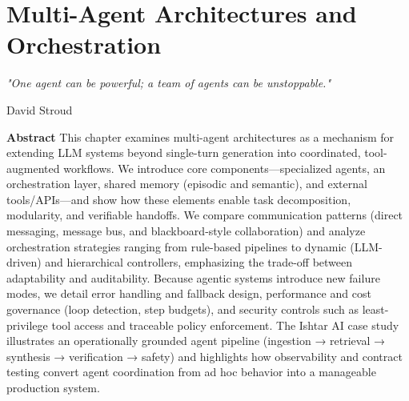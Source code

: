 \chapter{Multi-Agent Architectures and Orchestration}
\label{ch:multiagent}
\newrefsegment


\epigraph{\emph{"One agent can be powerful; a team of agents can be unstoppable."}}{David Stroud}

\textbf{Abstract} This chapter examines multi-agent architectures as a mechanism for extending LLM systems beyond single-turn generation into coordinated, tool-augmented workflows. We introduce core components—specialized agents, an orchestration layer, shared memory (episodic and semantic), and external tools/APIs—and show how these elements enable task decomposition, modularity, and verifiable handoffs. We compare communication patterns (direct messaging, message bus, and blackboard-style collaboration) and analyze orchestration strategies ranging from rule-based pipelines to dynamic (LLM-driven) and hierarchical controllers, emphasizing the trade-off between adaptability and auditability. Because agentic systems introduce new failure modes, we detail error handling and fallback design, performance and cost governance (loop detection, step budgets), and security controls such as least-privilege tool access and traceable policy enforcement. The Ishtar AI case study illustrates an operationally grounded agent pipeline (ingestion → retrieval → synthesis → verification → safety) and highlights how observability and contract testing convert agent coordination from ad hoc behavior into a manageable production system.

